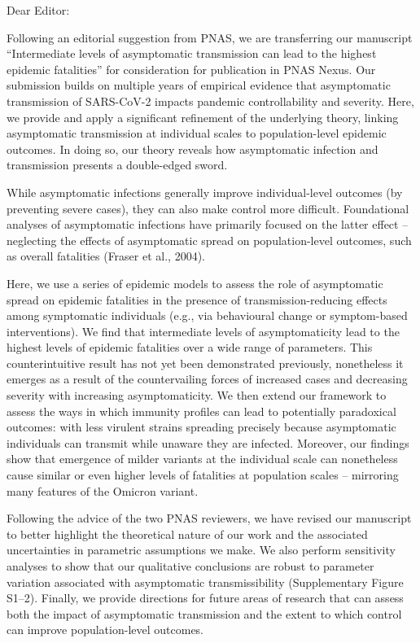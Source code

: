 \documentclass[12pt]{article}
\begin{document}
\noindent Dear Editor:

Following an editorial suggestion from PNAS, we are transferring our manuscript ``Intermediate levels of asymptomatic transmission can lead to the highest epidemic fatalities'' for consideration for publication in PNAS Nexus.
Our submission builds on multiple years of empirical evidence that asymptomatic transmission of SARS-CoV-2 impacts pandemic controllability and severity. 
Here, we provide and apply a significant refinement of the underlying theory, linking asymptomatic transmission at individual scales to population-level epidemic outcomes. 
In doing so, our theory reveals how asymptomatic infection and transmission presents a double-edged sword. 

While asymptomatic infections generally improve individual-level outcomes (by preventing severe cases), they can also make control more difficult. Foundational analyses of asymptomatic infections have primarily focused on the latter effect – neglecting the effects of asymptomatic spread on population-level outcomes, such as overall fatalities (Fraser et al., 2004). 

Here, we use a series of epidemic models to assess the role of asymptomatic spread on epidemic fatalities in the presence of transmission-reducing effects among symptomatic individuals (e.g., via behavioural change or symptom-based interventions). 
We find that intermediate levels of asymptomaticity lead to the highest levels of epidemic fatalities over a wide range of parameters. 
This counterintuitive result has not yet been demonstrated previously, nonetheless it emerges as a result of the countervailing forces of increased cases and decreasing severity with increasing asymptomaticity. 
We then extend our framework to assess the ways in which immunity profiles can lead to potentially paradoxical outcomes: with less virulent strains spreading precisely because asymptomatic individuals can transmit while unaware they are infected.  
Moreover, our findings show that emergence of milder variants at the individual scale can nonetheless cause similar or even higher levels of fatalities at population scales – mirroring many features of the Omicron variant. 

Following the advice of the two PNAS reviewers, we have revised our manuscript to better highlight the theoretical nature of our work and the associated uncertainties in parametric assumptions we make.
We also perform sensitivity analyses to show that our qualitative conclusions are robust to parameter variation associated with asymptomatic transmissibility (Supplementary Figure S1--2).
Finally, we provide directions for future areas of research that can assess both the impact of asymptomatic transmission and the extent to which control can improve population-level outcomes.
\end{document}
